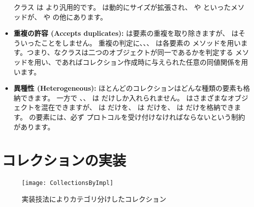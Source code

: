 \documentclass[a4paper,10pt,twoside]{book}
\begin{document}
\begin{itemize}
         クラス  は  より汎用的です。 は動的にサイズが拡張され、 や  といったメソッドが、 や  の他にあります。
  
  \item {\bf 重複の許容 (Accepts duplicates):}
  	 は要素の重複を取り除きますが、 はそういったことをしません。
	重複の判定に、、、 は各要素の \ct{=} メソッドを用います。つまり、なクラスは二つのオブジェクトが同一であるかを判定する \ct{==} メソッドを用い、であればコレクション作成時に与えられた任意の同値関係を用います。

  \item {\bf 異種性 (Heterogeneous):}
        ほとんどのコレクションはどんな種類の要素も格納できます。
        一方で 、、 は  だけしか入れられません。
         はさまざまなオブジェクトを混在できますが、 は  だけを、 は  だけを、 は  だけを格納できます。
	 の要素には、必ず  プロトコルを受け付けなければならないという制約があります。
\end{itemize}


\section{コレクションの実装}

\begin{figure*}
\begin{center}
\texttt{[image: CollectionsByImpl]}
\caption{実装技法によりカテゴリ分けしたコレクション
    }
\end{center}
\end{figure*}
\end{document}
